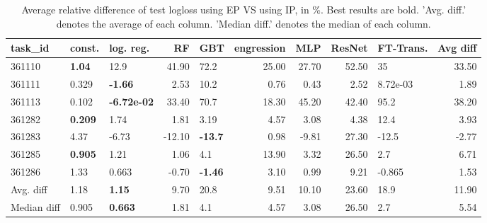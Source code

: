 \begin{table}[ht!]
\centering
\begingroup\footnotesize
\begin{tabular}{lllrlrrrlr}
  \hline
\hline
task\_id & const. & log. reg. & RF & GBT & engression & MLP & ResNet & FT-Trans. & Avg diff \\ 
  \hline
361110 & \textbf{1.04} & 12.9 & 41.90 & 72.2 & 25.00 & 27.70 & 52.50 & 35 & 33.50 \\ 
  361111 & 0.329 & \textbf{-1.66} & 2.53 & 10.2 & 0.76 & 0.43 & 2.52 &  8.72e-03 & 1.89 \\ 
  361113 & 0.102 & \textbf{-6.72e-02} & 33.40 & 70.7 & 18.30 & 45.20 & 42.40 & 95.2 & 38.20 \\ 
  361282 & \textbf{0.209} & 1.74 & 1.81 & 3.19 & 4.57 & 3.08 & 4.38 & 12.4 & 3.93 \\ 
  361283 & 4.37 & -6.73 & -12.10 & \textbf{-13.7} & 0.98 & -9.81 & 27.30 & -12.5 & -2.77 \\ 
  361285 & \textbf{0.905} & 1.21 & 1.06 & 4.1 & 13.90 & 3.32 & 26.50 & 2.7 & 6.71 \\ 
  361286 & 1.33 & 0.663 & -0.70 & \textbf{-1.46} & 3.10 & 0.99 & 9.21 & -0.865 & 1.53 \\ 
   \hline
Avg. diff & 1.18 & \textbf{1.15} & 9.70 & 20.8 & 9.51 & 10.10 & 23.60 & 18.9 & 11.90 \\ 
  Median diff & 0.905 & \textbf{0.663} & 1.81 & 4.1 & 4.57 & 3.08 & 26.50 & 2.7 & 5.54 \\ 
   \hline
\hline
\end{tabular}
\endgroup
\caption{Average relative difference of test logloss using EP VS using IP, in \%. 
                  Best results are bold. 
                  'Avg. diff.' denotes the average of each column.
                  'Median diff.' denotes the median of each column.} 
\label{TABLES/table_results_logloss_clustering_num_and_cat_features_EP_VS_IP}
\end{table}
